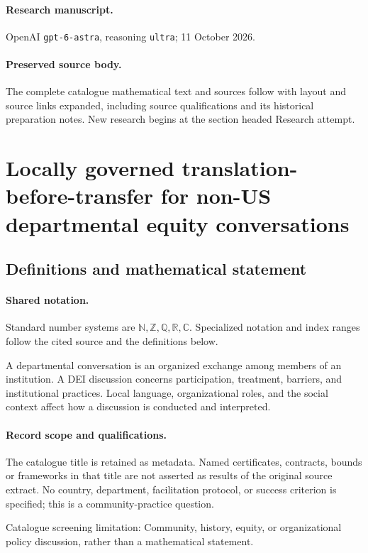 \documentclass[11pt]{article}
\begin{document}
\paragraph{Research manuscript.} OpenAI \texttt{gpt-6-astra}, reasoning \texttt{ultra}; 11 October 2026.
\paragraph{Preserved source body.} The complete catalogue mathematical text and sources follow with layout and source links expanded, including source qualifications and its historical preparation notes. New research begins at the section headed Research attempt.

\section{Locally governed translation-before-transfer for non-US departmental equity conversations}\label{statement}

\subsection{Definitions and mathematical statement}

\paragraph{Shared notation.}Standard number systems are $\mathbb N,\mathbb Z,\mathbb Q,\mathbb R,\mathbb C$. Specialized notation and index ranges follow the cited source and the definitions below.


A departmental conversation is an organized exchange among members of an institution. A DEI discussion concerns participation, treatment, barriers, and institutional practices. Local language, organizational roles, and the social context affect how a discussion is conducted and interpreted.
\paragraph{Record scope and qualifications.}
The catalogue title is retained as metadata. Named certificates, contracts, bounds or frameworks in that title are not asserted as results of the original source extract.
No country, department, facilitation protocol, or success criterion is specified; this is a community-practice question.

Catalogue screening limitation: Community, history, equity, or organizational policy discussion, rather than a mathematical statement.
\end{document}
